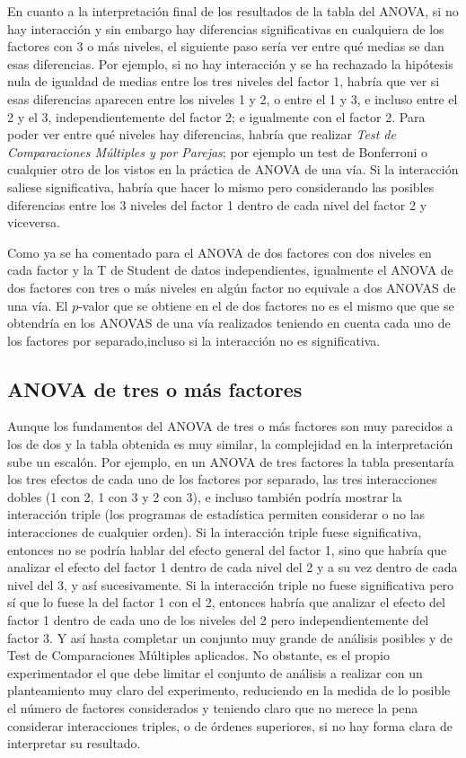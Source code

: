 \documentclass[
  spanish,
  a4paper,
]{scrreport}
\theoremstyle{plain}
\theoremstyle{definition}
\theoremstyle{definition}
\theoremstyle{remark}
\begin{document}
En cuanto a la interpretación final de los resultados de la tabla del
ANOVA, si no hay interacción y sin embargo hay diferencias
significativas en cualquiera de los factores con 3 o más niveles, el
siguiente paso sería ver entre qué medias se dan esas diferencias. Por
ejemplo, si no hay interacción y se ha rechazado la hipótesis nula de
igualdad de medias entre los tres niveles del factor 1, habría que ver
si esas diferencias aparecen entre los niveles 1 y 2, o entre el 1 y 3,
e incluso entre el 2 y el 3, independientemente del factor 2; e
igualmente con el factor 2. Para poder ver entre qué niveles hay
diferencias, habría que realizar \emph{Test de Comparaciones Múltiples y
por Parejas}; por ejemplo un test de Bonferroni o cualquier otro de los
vistos en la práctica de ANOVA de una vía. Si la interacción saliese
significativa, habría que hacer lo mismo pero considerando las posibles
diferencias entre los 3 niveles del factor 1 dentro de cada nivel del
factor 2 y viceversa.

Como ya se ha comentado para el ANOVA de dos factores con dos niveles en
cada factor y la T de Student de datos independientes, igualmente el
ANOVA de dos factores con tres o más niveles en algún factor no equivale
a dos ANOVAS de una vía. El \(p\)-valor que se obtiene en el de dos
factores no es el mismo que que se obtendría en los ANOVAS de una vía
realizados teniendo en cuenta cada uno de los factores por
separado,incluso si la interacción no es significativa.

\subsection{ANOVA de tres o más
factores}\label{anova-de-tres-o-muxe1s-factores}

Aunque los fundamentos del ANOVA de tres o más factores son muy
parecidos a los de dos y la tabla obtenida es muy similar, la
complejidad en la interpretación sube un escalón. Por ejemplo, en un
ANOVA de tres factores la tabla presentaría los tres efectos de cada uno
de los factores por separado, las tres interacciones dobles (1 con 2, 1
con 3 y 2 con 3), e incluso también podría mostrar la interacción triple
(los programas de estadística permiten considerar o no las interacciones
de cualquier orden). Si la interacción triple fuese significativa,
entonces no se podría hablar del efecto general del factor 1, sino que
habría que analizar el efecto del factor 1 dentro de cada nivel del 2 y
a su vez dentro de cada nivel del 3, y así sucesivamente. Si la
interacción triple no fuese significativa pero sí que lo fuese la del
factor 1 con el 2, entonces habría que analizar el efecto del factor 1
dentro de cada uno de los niveles del 2 pero independientemente del
factor 3. Y así hasta completar un conjunto muy grande de análisis
posibles y de Test de Comparaciones Múltiples aplicados. No obstante, es
el propio experimentador el que debe limitar el conjunto de análisis a
realizar con un planteamiento muy claro del experimento, reduciendo en
la medida de lo posible el número de factores considerados y teniendo
claro que no merece la pena considerar interacciones triples, o de
órdenes superiores, si no hay forma clara de interpretar su resultado.
\end{document}
